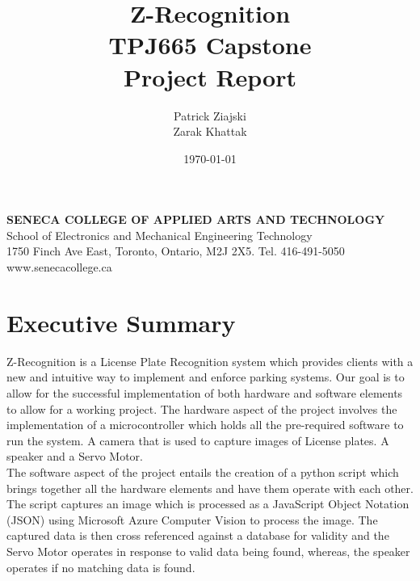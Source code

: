 \documentclass[12pt]{article}
\title{Z-Recognition\\TPJ665 Capstone\\Project Report}
\author{Patrick Ziajski \\ Zarak Khattak}
\date{\today}
\begin{document}
\maketitle
\vfill
\begin{center}
    \textbf{SENECA COLLEGE OF APPLIED ARTS AND TECHNOLOGY}\\School of Electronics and Mechanical Engineering Technology\\1750 Finch Ave East, Toronto, Ontario, M2J 2X5. Tel. 416-491-5050\\www.senecacollege.ca
\end{center}
\thispagestyle{empty}

\newpage
\section{Executive Summary}
Z-Recognition is a License Plate Recognition system which provides clients with a new and intuitive way to implement and enforce parking systems. Our goal is to allow for the successful implementation of both hardware and software elements to allow for a working project.
The hardware aspect of the project involves the implementation of a microcontroller which holds all the pre-required software to run the system. A camera that is  used to capture images of License plates. A speaker and a Servo Motor.\vspace{0.5cm}\\ 
The software aspect of the project entails the creation of a python script which brings together all the hardware elements and have them operate with each other. The script captures an image which is processed as a JavaScript Object Notation (JSON) using Microsoft Azure Computer Vision to process the image. The captured data is then cross referenced against a database for validity and the Servo Motor operates in response to valid data being found, whereas, the speaker operates if no matching data is found.

\newpage
\tableofcontents
\newpage
\listoffigures
\listoftables

\newpage
{}
\end{document}
